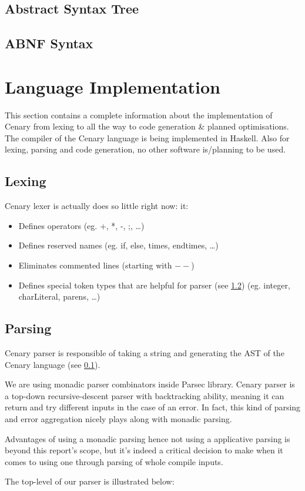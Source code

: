 \documentclass{article}
\begin{document}
\subsection{Abstract Syntax Tree}
\label{subsec:ast}

\subsection{ABNF Syntax}
\label{subsec:abnf_syntax}

\section{Language Implementation}
This section contains a complete information about the implementation of Cenary from lexing to all the way to code generation \& planned optimisations.
The compiler of the Cenary language is being implemented in Haskell. Also for lexing, parsing and code generation, no other software is/planning to be used.
\subsection{Lexing}
\label{subsec:lexing}
Cenary lexer is actually does so little right now: it:
\begin{itemize}
  \item Defines operators (eg. +, *, -, ;, \ldots)
  \item Defines reserved names (eg. if, else, times, endtimes, \ldots)
  \item Eliminates commented lines (starting with $--$)
  \item Defines special token types that are helpful for parser (see \ref{subsec:parsing}) (eg. integer, charLiteral, parens, \ldots)
\end{itemize}
\newpage
\subsection{Parsing}
\label{subsec:parsing}
Cenary parser is responsible of taking a string and generating the AST of the Cenary language (see \ref{subsec:ast}).
\par We are using monadic parser combinators inside Parsec library. Cenary parser is a top-down recursive-descent parser with backtracking ability, meaning it can return and try different inputs in the case of an error. In fact, this kind of parsing and error aggregation nicely plays along with monadic parsing.
\par Advantages of using a monadic parsing hence not using a applicative parsing is beyond this report's scope, but it's indeed a critical decision to make when it comes to using one through parsing of whole compile inputs.
\par The top-level of our parser is illustrated below:

\end{document}
